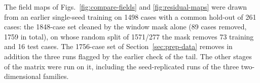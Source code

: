 \documentclass[subscriptcorrection,upint,varvw,barcolor=Goldenrod3,mathalfa=cal=euler,balance,hyphenate,french,pdf-a]{asmejour} %
\begin{document}
The field maps of Figs.~\ref{fig:compare-fields} and \ref{fig:residual-maps} were drawn from an earlier single-seed training on 1498 cases with a common hold-out of 261 cases: the 1848-case set cleaned by the window mask alone (89 cases removed, 1759 in total), on whose random split of 1571/277 the mask removes 73 training and 16 test cases. %
The 1756-case set of Section~\ref{sec:prep-data} removes in addition the three runs flagged by the earlier check of the tail. The other stages of the matrix were run on it, including the seed-replicated runs of the three two-dimensional families. %
\end{document}
